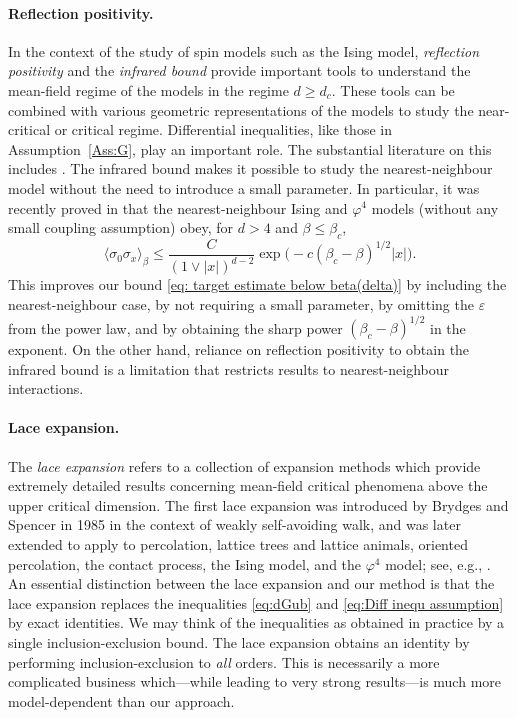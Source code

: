 \documentclass[11pt,a4paper]{article}
\numberwithin{equation}{section}
\theoremstyle{plain}
\theoremstyle{definition}
\newcommand\1{\mathds{1}}
\begin{document}
\paragraph{Reflection positivity.} In the context of the study of spin models such as
the Ising model, \emph{reflection positivity} and the \emph{infrared bound} \cite{FSS76,FILS78} provide important tools to understand the mean-field regime of the models in the regime $d\geq d_c$. These tools can be combined with various geometric representations of the models to study the near-critical or critical regime. Differential inequalities, like those in Assumption~\ref{Ass:G}, play an important role.
The substantial literature on this includes
\cite{Aize82,Froh82,AG83,AF86,AD21,FFS92,Pani26,LPS25-Ising,Pani25,DP25-Ising,EGPS26}.
The infrared bound makes it possible to study the nearest-neighbour model without
the need to introduce a small parameter.
In particular, it was recently proved in \cite{DP25-Ising} that the nearest-neighbour
Ising and $\varphi^4$ models (without any small coupling assumption) obey,
for $d>4$ and $\beta \le \beta_c$,
\begin{equation}
\label{eq:better}
    \langle \sigma_0\sigma_x \rangle_\beta
    \le
    \frac{C}{ (1\vee|x|)^{d-2}}
    \exp\big(-c(\beta_c-\beta)^{1/2}|x| \big).
\end{equation}
This improves our bound \eqref{eq: target estimate below beta(delta)}
by including the nearest-neighbour case, by not requiring a small parameter, by omitting
the $\varepsilon$ from the power law, and by obtaining the sharp power $(\beta_c
-\beta)^{1/2}$ in the exponent.
On the other hand, reliance on reflection
positivity to obtain the infrared bound is a limitation that restricts results to
nearest-neighbour interactions.


\paragraph{Lace expansion.}
The \emph{lace expansion} refers to a collection of expansion
methods which provide extremely detailed
results concerning mean-field critical phenomena above the
upper critical dimension.
The first lace expansion
was introduced by Brydges and Spencer in 1985 \cite{BS85} in the context of weakly self-avoiding walk, and was later
extended to apply to percolation, lattice trees and lattice animals, oriented percolation,
the contact process, the Ising model, and the $\varphi^4$ model; see, e.g.,
\cite{Slad06,HS90a,HS90b,Saka07,Saka14,BHH21}.
An essential distinction between the lace expansion and our method is that
the lace expansion replaces the inequalities \eqref{eq:dGub} and \eqref{eq:Diff inequ assumption}
by exact identities.  We may think of the inequalities as obtained in practice
by a single inclusion-exclusion bound.  The lace expansion obtains an identity
by performing inclusion-exclusion to \emph{all} orders.  This is necessarily a more
complicated business which---while leading to very strong results---is
much more model-dependent than our approach.
\end{document}
